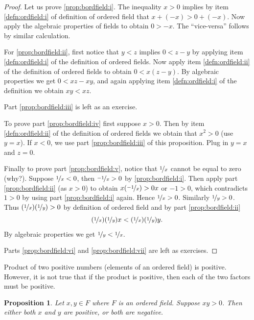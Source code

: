 \documentclass[12pt]{book}
\theoremstyle{plain}
\newtheorem{prop}[thm]{Proposition}
\theoremstyle{remark}
\theoremstyle{definition}
\theoremstyle{exercise}
\theoremstyle{example}
\begin{document}
\begin{proof}
Let us prove \ref{prop:bordfield:i}.  The inequality $x > 0$ implies by item
\ref{defn:ordfield:i} of definition of ordered field that
$x + (-x) > 0 + (-x)$.  Now apply the algebraic properties of fields to
obtain $0 > -x$.  The ``vice-versa'' follows by similar calculation.

For \ref{prop:bordfield:ii}, first notice that $y < z$ implies
$0 < z - y$ by applying 
item \ref{defn:ordfield:i} of the definition of ordered fields.  
Now apply item 
\ref{defn:ordfield:ii} of the definition of ordered fields to obtain
$0 < x(z-y)$.  By algebraic properties we get $0 < xz - xy$,
and again applying item
\ref{defn:ordfield:i} of the definition we obtain $xy < xz$.

Part \ref{prop:bordfield:iii} is left as an exercise.

To prove part \ref{prop:bordfield:iv} first suppose $x > 0$.  Then
by item 
\ref{defn:ordfield:ii} of the definition of ordered fields we obtain
that $x^2 > 0$ (use $y=x$).  If $x < 0$, we use 
part \ref{prop:bordfield:iii} of this proposition.  Plug in $y=x$ and
$z=0$.

Finally to prove part \ref{prop:bordfield:v}, notice that
$\nicefrac{1}{x}$ cannot be equal to zero (why?).
Suppose $\nicefrac{1}{x} < 0$,
then $\nicefrac{-1}{x} > 0$ by \ref{prop:bordfield:i}.  Then apply
part \ref{prop:bordfield:ii} (as $x > 0$) to obtain
$x(\nicefrac{-1}{x}) > 0x$ or $-1 > 0$, which contradicts $1 > 0$ by using part
\ref{prop:bordfield:i} again.  Hence $\nicefrac{1}{x} > 0$.
Similarly $\nicefrac{1}{y} > 0$.  Thus $(\nicefrac{1}{x})(\nicefrac{1}{y}) > 0$
by definition of ordered field and by part \ref{prop:bordfield:ii}
\begin{equation*}
(\nicefrac{1}{x})(\nicefrac{1}{y})x < (\nicefrac{1}{x})(\nicefrac{1}{y})y .
\end{equation*}
By algebraic properties we get $\nicefrac{1}{y} < \nicefrac{1}{x}$.

Parts \ref{prop:bordfield:vi} and \ref{prop:bordfield:vii} are left as
exercises.
\end{proof}

Product of two positive numbers (elements of an ordered field) is positive.
However, it is not true that if the product is positive, then each of the two
factors must be positive.

\begin{prop}
Let $x,y \in F$ where $F$ is an ordered field.  Suppose 
$xy > 0$.  Then either both $x$ and $y$ are positive, or both are negative.
\end{prop}
\end{document}
